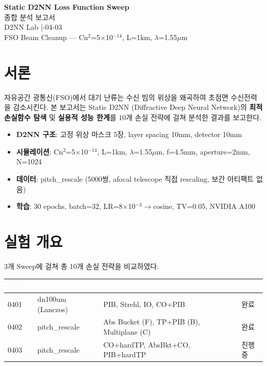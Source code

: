 \documentclass[11pt,a4paper]{article}
\begin{document}
\begin{center}
{\Huge\bfseries\sffamily\textcolor{darkbg}{Static D2NN Loss Function Sweep}}\\[0.5em]
{\LARGE\sffamily\textcolor{accent}{종합 분석 보고서}}\\[1.5em]
{\large\sffamily D2NN Lab \quad|-04-03}\\[0.3em]
{\small\textcolor{muted}{FSO Beam Cleanup --- Cn$^2$=5$\times$10$^{-14}$, L=1km, $\lambda$=1.55$\mu$m}}
\end{center}
\vspace{1em}

\section{서론}

자유공간 광통신(FSO)에서 대기 난류는 수신 빔의 위상을 왜곡하여 초점면 수신전력을 감소시킨다.
본 보고서는 Static D2NN (Diffractive Deep Neural Network)의 \textbf{최적 손실함수 탐색} 및
\textbf{실용적 성능 한계}를 10개 손실 전략에 걸쳐 분석한 결과를 보고한다.

\begin{itemize}
\item \textbf{D2NN 구조}: 고정 위상 마스크 5장, layer spacing 10mm, detector 10mm
\item \textbf{시뮬레이션}: Cn$^2$=5$\times$10$^{-14}$, L=1km, $\lambda$=1.55$\mu$m, f=4.5mm, aperture=2mm, N=1024
\item \textbf{데이터}: pitch\_rescale (5000쌍, afocal telescope 직접 rescaling, 보간 아티팩트 없음)
\item \textbf{학습}: 30 epochs, batch=32, LR=8$\times$10$^{-3}$$\rightarrow$cosine, TV=0.05, NVIDIA A100
\end{itemize}


\section{실험 개요}

3개 Sweep에 걸쳐 총 10개 손실 전략을 비교하였다.

\begin{table}[H]
\centering
\begin{tabular}{llll}
\toprule
\rowcolor{tableheader}\textcolor{white}{\textbf{Sweep}} & \textcolor{white}{\textbf{데이터}} & \textcolor{white}{\textbf{전략}} & \textcolor{white}{\textbf{상태}} \\
\midrule
0401 & dn100um (Lanczos) & PIB, Strehl, IO, CO+PIB & 완료 \\
\rowcolor{tablealt}0402 & pitch\_rescale & Abs Bucket (F), TP+PIB (B), Multiplane (C) & 완료 \\
0403 & pitch\_rescale & CO+hardTP, AbsBkt+CO, PIB+hardTP & 진행중 \\
\bottomrule
\end{tabular}
\end{table}
\end{document}
